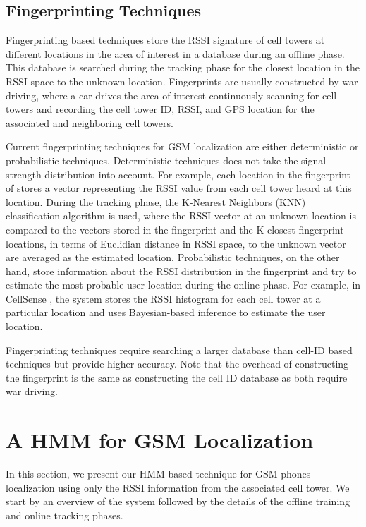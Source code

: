 \documentclass[conference]{IEEEtran}
\begin{document}
\subsection{Fingerprinting Techniques}
Fingerprinting based techniques store the RSSI signature of cell
towers at different locations in the area of interest in a database
during an offline phase. This database is searched during the
tracking phase for the closest location in the RSSI space to the
unknown location. Fingerprints are usually constructed by war
driving, where a car drives the area of interest continuously
scanning for cell towers and recording the cell tower ID, RSSI, and
GPS location for the associated and neighboring cell towers.

Current fingerprinting techniques for GSM localization are either
deterministic \cite{PlaceLab,GSM_INDOOR} or probabilistic
\cite{CellSense} techniques. Deterministic techniques does not take
the signal strength distribution into account. For example, each
location in the fingerprint of \cite{PlaceLab} stores a vector
representing the RSSI value from each cell tower heard at this
location. During the tracking phase, the K-Nearest Neighbors (KNN)
classification algorithm is used, where the RSSI vector at an
unknown location is compared to the vectors stored in the
fingerprint and the K-closest fingerprint locations, in terms of
Euclidian distance in RSSI space, to the unknown vector are averaged
as the estimated location. Probabilistic techniques, on the other
hand, store information about the RSSI distribution in the
fingerprint and try to estimate the most probable user location
during the online phase. For example, in CellSense \cite{CellSense},
the system stores the RSSI histogram for each cell tower at a
particular location and uses Bayesian-based inference to estimate
the user location.

Fingerprinting techniques require searching a larger database than
cell-ID based techniques but provide higher accuracy. Note that the
overhead of constructing the fingerprint is the same as constructing
the cell ID database as both require war driving.


\section{A HMM for GSM Localization}\label{HMM}
In this section, we present our HMM-based technique for GSM phones
localization using only the RSSI information from the associated
cell tower. We start by an overview of the system followed by the
details of the offline training and online tracking phases.
\end{document}
